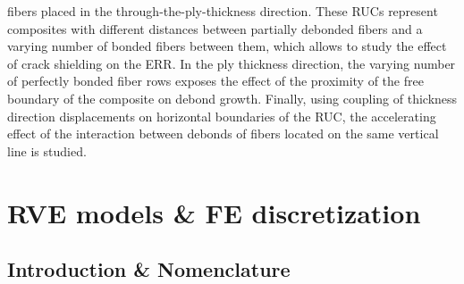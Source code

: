 fibers placed in the through-the-ply-thickness direction. These RUCs represent composites with different distances between partially debonded fibers and a varying number of bonded fibers between them, which allows to study the effect of crack shielding on the ERR. In the ply thickness direction, the varying number of perfectly bonded fiber rows exposes the effect of the proximity of the free boundary of the composite on debond growth. Finally, using coupling of thickness direction displacements on horizontal boundaries of the RUC, the accelerating effect of the interaction between debonds of fibers located on the same vertical line is studied.

\section{RVE models \& FE discretization}

\subsection{Introduction \& Nomenclature}\label{paperB:subsec:names}

